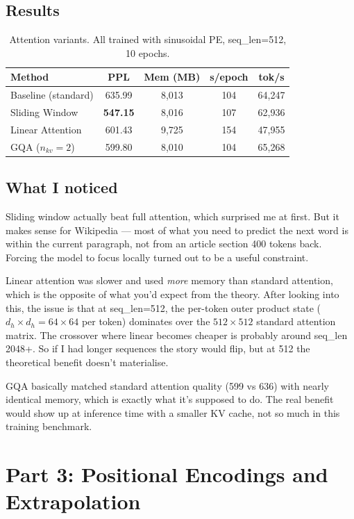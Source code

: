 \documentclass[12pt,a4paper]{article}
\begin{document}
\subsection{Results}

\begin{table}[H]
\centering
\caption{Attention variants. All trained with sinusoidal PE, seq\_len=512, 10 epochs.}
\begin{tabular}{lcccc}
\toprule
\textbf{Method} & \textbf{PPL} & \textbf{Mem (MB)} & \textbf{s/epoch} & \textbf{tok/s} \\
\midrule
Baseline (standard) & 635.99 & 8,013 & 104 & 64,247 \\
Sliding Window & \textbf{547.15} & 8,016 & 107 & 62,936 \\
Linear Attention & 601.43 & 9,725 & 154 & 47,955 \\
GQA ($n_{kv}=2$) & 599.80 & 8,010 & 104 & 65,268 \\
\bottomrule
\end{tabular}
\end{table}

\subsection{What I noticed}

Sliding window actually beat full attention, which surprised me at first. But it makes sense for Wikipedia — most of what you need to predict the next word is within the current paragraph, not from an article section 400 tokens back. Forcing the model to focus locally turned out to be a useful constraint.

Linear attention was slower and used \textit{more} memory than standard attention, which is the opposite of what you'd expect from the theory. After looking into this, the issue is that at seq\_len=512, the per-token outer product state ($d_h \times d_h = 64 \times 64$ per token) dominates over the $512 \times 512$ standard attention matrix. The crossover where linear becomes cheaper is probably around seq\_len 2048+. So if I had longer sequences the story would flip, but at 512 the theoretical benefit doesn't materialise.

GQA basically matched standard attention quality (599 vs 636) with nearly identical memory, which is exactly what it's supposed to do. The real benefit would show up at inference time with a smaller KV cache, not so much in this training benchmark.

\section{Part 3: Positional Encodings and Extrapolation}
\end{document}

